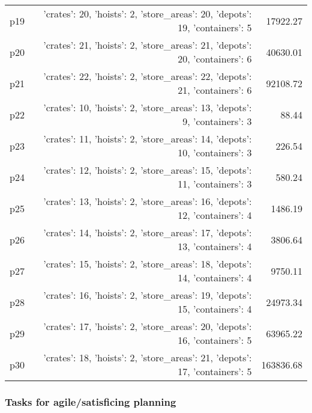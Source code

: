 \documentclass{article}
\begin{document}
\begin{center}
\begin{tabular}{@{}l|r|r@{}}
  p19&{'crates': 20, 'hoists': 2, 'store\_areas': 20, 'depots': 19, 'containers': 5}&17922.27\\
  p20&{'crates': 21, 'hoists': 2, 'store\_areas': 21, 'depots': 20, 'containers': 6}&40630.01\\
  p21&{'crates': 22, 'hoists': 2, 'store\_areas': 22, 'depots': 21, 'containers': 6}&92108.72\\
  p22&{'crates': 10, 'hoists': 2, 'store\_areas': 13, 'depots': 9, 'containers': 3}&88.44\\
  p23&{'crates': 11, 'hoists': 2, 'store\_areas': 14, 'depots': 10, 'containers': 3}&226.54\\
  p24&{'crates': 12, 'hoists': 2, 'store\_areas': 15, 'depots': 11, 'containers': 3}&580.24\\
  p25&{'crates': 13, 'hoists': 2, 'store\_areas': 16, 'depots': 12, 'containers': 4}&1486.19\\
  p26&{'crates': 14, 'hoists': 2, 'store\_areas': 17, 'depots': 13, 'containers': 4}&3806.64\\
  p27&{'crates': 15, 'hoists': 2, 'store\_areas': 18, 'depots': 14, 'containers': 4}&9750.11\\
  p28&{'crates': 16, 'hoists': 2, 'store\_areas': 19, 'depots': 15, 'containers': 4}&24973.34\\
  p29&{'crates': 17, 'hoists': 2, 'store\_areas': 20, 'depots': 16, 'containers': 5}&63965.22\\
  p30&{'crates': 18, 'hoists': 2, 'store\_areas': 21, 'depots': 17, 'containers': 5}&163836.68
                            \end{tabular}
                            \end{center}
                    

                                \subsubsection*{Tasks for agile/satisficing planning}
                                
\end{document}
